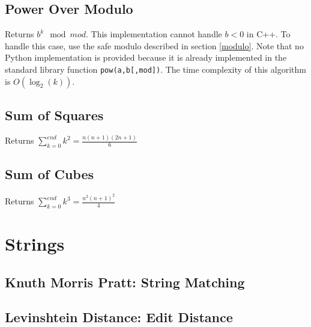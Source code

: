 \documentclass[letterpaper,11pt,twoside]{article}
\begin{document}
            \subsection{Power Over Modulo} \label{power}
                Returns $b^{k} \mod mod$.
                This implementation cannot handle $b < 0$ in C++.
                To handle this case, use the safe modulo described in section \ref{modulo}.
                Note that no Python implementation is provided because it is already implemented in the standard library function \verb|pow(a,b[,mod])|.
                The time complexity of this algorithm is $O(\log_{2}(k))$.
                
            \subsection{Sum of Squares}
                Returns $\sum_{k=0}^{end} k^{2} = \frac{n(n+1)(2n+1)}{6}$
                
                
            \subsection{Sum of Cubes}
                Returns $\sum_{k=0}^{end} k^{3} = \frac{n^{2}(n+1)^{2}}{4}$
                
                
        \section{Strings}
            \subsection{Knuth Morris Pratt: String Matching} \label{kmp}
            \subsection{Levinshtein Distance: Edit Distance}
\end{document}
